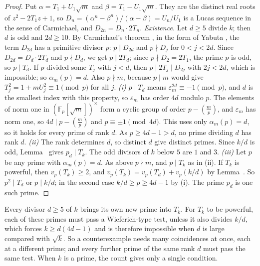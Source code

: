 \begin{proof}
Put $\alpha = T_1 + U_1\sqrt{m}$ and $\beta = T_1 - U_1\sqrt{m}$. They are the distinct real roots of $z^2 - 2T_1 z + 1$, so
$D_n = (\alpha^n - \beta^n)/(\alpha - \beta) = U_n/U_1$ is a Lucas sequence in the sense of Carmichael, and $D_{2n} = D_n \cdot 2T_n$.
\emph{Existence.} Let $d \ge 5$ divide $k$; then $d$ is odd and $2d \ge 10$. By Carmichael's theorem
\cite{Carmichael1913}, in the form of Yabuta \cite[Theorem~1]{Yabuta2001}, the term $D_{2d}$ has a primitive divisor $p$: $p \mid D_{2d}$ and
$p \nmid D_j$ for $0 < j < 2d$. Since $D_{2d} = D_d \cdot 2T_d$ and $p \nmid D_d$, we get $p \mid 2T_d$; since $p \nmid D_2 = 2T_1$, the prime $p$ is
odd, so $p \mid T_d$. If $p$ divided some $T_j$ with $j < d$, then $p \mid 2T_j \mid D_{2j}$ with $2j < 2d$, which is impossible; so
$\alpha_m(p) = d$. Also $p \nmid m$, because $p \mid m$ would give $T_j^2 = 1 + m U_j^2 \equiv 1 \pmod p$ for all $j$.
\emph{(i)} $p \mid T_d$ means $\varepsilon_m^{2d} \equiv -1 \pmod p$, and $d$ is the smallest index with this property, so $\varepsilon_m$ has
order $4d$ modulo $p$. The elements of norm one in $(\mathbb{F}_p[\sqrt{m}])^\times$ form a cyclic group of order $p - (\tfrac{m}{p})$, and
$\varepsilon_m$ has norm one, so $4d \mid p - (\tfrac{m}{p})$ and $p \equiv \pm 1 \pmod{4d}$. This uses only $\alpha_m(p) = d$, so it holds for
every prime of rank $d$. As $p \ge 4d - 1 > d$, no prime dividing $d$ has rank $d$.
\emph{(ii)} The rank determines $d$, so distinct $d$ give distinct primes. Since $k/d$ is odd, Lemma~ gives $p_d \mid T_k$. The
odd divisors of $k$ below $5$ are $1$ and $3$.
\emph{(iii)} Let $p$ be any prime with $\alpha_m(p) = d$. As above $p \nmid m$, and $p \mid T_k$ as in (ii). If $T_k$ is powerful, then $v_p(T_k) \ge 2$, and
$v_p(T_k) = v_p(T_d) + v_p(k/d)$ by Lemma~. So $p^2 \mid T_d$ or $p \mid k/d$; in the second case $k/d \ge p \ge 4d - 1$ by (i).
The prime $p_d$ is one such prime.
\end{proof}

\inwords Every divisor $d \ge 5$ of $k$ brings its own new prime into $T_k$. For $T_k$ to be powerful, each of these primes must pass a
Wieferich-type test, unless it also divides $k/d$, which forces $k \ge d(4d - 1)$ and is therefore impossible when $d$ is large compared with $\sqrt{k}$. So a counterexample needs many
coincidences at once, each at a different prime; and every further prime of the same rank $d$ must pass the same test. When $k$ is a prime, the count gives only a single condition.

